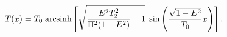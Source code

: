 \begin{equation}\label{ear}
T(x) = T_0 \;{\rm arcsinh} \left[
           \sqrt{\frac{E^2T_2^2}{\Pi^2(1-E^2)} - 1} 
	   \;\sin\left(\frac{\sqrt{1-E^2}}{T_0} x \right) \right].
\end{equation}

